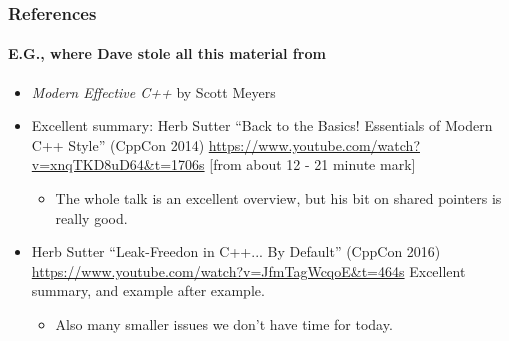 \begin{frame}[fragile]
\frametitle{References}
\framesubtitle{E.G., where Dave stole all this material from}

\begin{itemize}
\item \emph{Modern Effective C++} by Scott Meyers
\vskip 6pt
\item Excellent summary: Herb Sutter ``Back to the Basics! Essentials
  of Modern C++ Style'' (CppCon 2014)
  \url{https://www.youtube.com/watch?v=xnqTKD8uD64&t=1706s}
  [from about 12 - 21 minute mark]
\begin{itemize}
  \item The whole talk is an excellent overview, but his bit on shared
    pointers is really good.
\end{itemize}
\vskip 6pt
\item Herb Sutter ``Leak-Freedon in C++... By Default'' (CppCon 2016)
\url{https://www.youtube.com/watch?v=JfmTagWcqoE&t=464s}
Excellent summary, and example after example.
\begin{itemize}
  \item Also many smaller issues we don't have time for today.
\end{itemize}
\end{itemize}


\end{frame}

